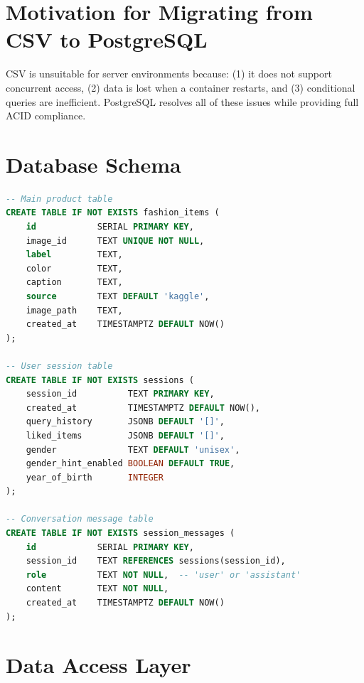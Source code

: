 \section{Motivation for Migrating from CSV to PostgreSQL}
\begin{tcolorbox}[title=Note]
CSV is unsuitable for server environments because: (1) it does not support concurrent access, (2) data is lost when a container restarts, and (3) conditional queries are inefficient. PostgreSQL resolves all of these issues while providing full ACID compliance.
\end{tcolorbox}

\section{Database Schema}

\begin{lstlisting}[language=sql,caption={PostgreSQL schema for the Fashion Agent}]
-- Main product table
CREATE TABLE IF NOT EXISTS fashion_items (
    id            SERIAL PRIMARY KEY,
    image_id      TEXT UNIQUE NOT NULL,
    label         TEXT,
    color         TEXT,
    caption       TEXT,
    source        TEXT DEFAULT 'kaggle',
    image_path    TEXT,
    created_at    TIMESTAMPTZ DEFAULT NOW()
);

-- User session table
CREATE TABLE IF NOT EXISTS sessions (
    session_id          TEXT PRIMARY KEY,
    created_at          TIMESTAMPTZ DEFAULT NOW(),
    query_history       JSONB DEFAULT '[]',
    liked_items         JSONB DEFAULT '[]',
    gender              TEXT DEFAULT 'unisex',
    gender_hint_enabled BOOLEAN DEFAULT TRUE,
    year_of_birth       INTEGER
);

-- Conversation message table
CREATE TABLE IF NOT EXISTS session_messages (
    id            SERIAL PRIMARY KEY,
    session_id    TEXT REFERENCES sessions(session_id),
    role          TEXT NOT NULL,  -- 'user' or 'assistant'
    content       TEXT NOT NULL,
    created_at    TIMESTAMPTZ DEFAULT NOW()
);
\end{lstlisting}

\section{Data Access Layer}

